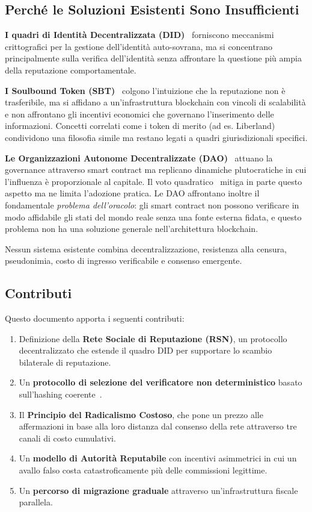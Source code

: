 \documentclass[11pt,a4paper,twocolumn]{article}
\begin{document}
\subsection{Perché le Soluzioni Esistenti Sono Insufficienti}

\textbf{I quadri di Identità Decentralizzata (DID)}~\cite{did2022} forniscono meccanismi crittografici per la gestione dell'identità auto-sovrana, ma si concentrano principalmente sulla verifica dell'identità senza affrontare la questione più ampia della reputazione comportamentale.

\textbf{I Soulbound Token (SBT)}~\cite{weyl2022} colgono l'intuizione che la reputazione non è trasferibile, ma si affidano a un'infrastruttura blockchain con vincoli di scalabilità e non affrontano gli incentivi economici che governano l'inserimento delle informazioni. Concetti correlati come i token di merito (ad es. Liberland) condividono una filosofia simile ma restano legati a quadri giurisdizionali specifici.

\textbf{Le Organizzazioni Autonome Decentralizzate (DAO)}~\cite{buterin2014} attuano la governance attraverso smart contract ma replicano dinamiche plutocratiche in cui l'influenza è proporzionale al capitale. Il voto quadratico~\cite{buterin2019} mitiga in parte questo aspetto ma ne limita l'adozione pratica. Le DAO affrontano inoltre il fondamentale \emph{problema dell'oracolo}: gli smart contract non possono verificare in modo affidabile gli stati del mondo reale senza una fonte esterna fidata, e questo problema non ha una soluzione generale nell'architettura blockchain.

Nessun sistema esistente combina decentralizzazione, resistenza alla censura, pseudonimia, costo di ingresso verificabile e consenso emergente.

\subsection{Contributi}

Questo documento apporta i seguenti contributi:
\begin{enumerate}[nosep]
\item Definizione della \textbf{Rete Sociale di Reputazione (RSN)}, un protocollo decentralizzato che estende il quadro DID per supportare lo scambio bilaterale di reputazione.
\item Un \textbf{protocollo di selezione del verificatore non deterministico} basato sull'hashing coerente~\cite{karger1997}.
\item Il \textbf{Principio del Radicalismo Costoso}, che pone un prezzo alle affermazioni in base alla loro distanza dal consenso della rete attraverso tre canali di costo cumulativi.
\item Un \textbf{modello di Autorità Reputabile} con incentivi asimmetrici in cui un avallo falso costa catastroficamente più delle commissioni legittime.
\item Un \textbf{percorso di migrazione graduale} attraverso un'infrastruttura fiscale parallela.
\end{enumerate}
\end{document}
